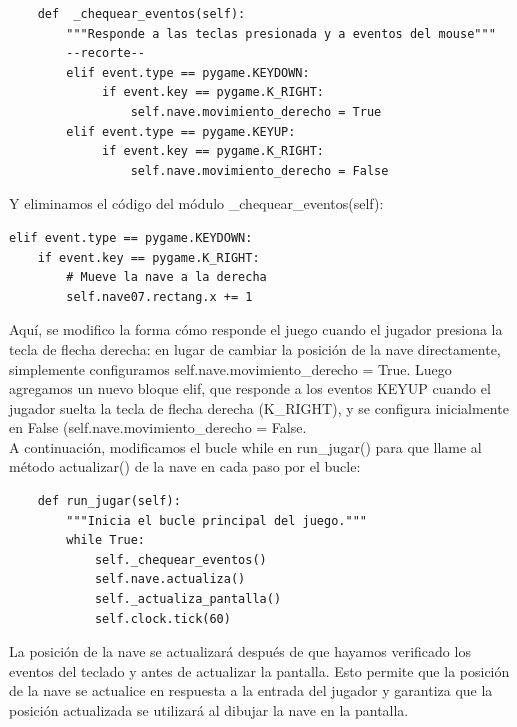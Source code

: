 \begin{lstlisting}
    def  _chequear_eventos(self):
        """Responde a las teclas presionada y a eventos del mouse"""
        --recorte--
        elif event.type == pygame.KEYDOWN:
             if event.key == pygame.K_RIGHT:
                 self.nave.movimiento_derecho = True
        elif event.type == pygame.KEYUP:
             if event.key == pygame.K_RIGHT:
                 self.nave.movimiento_derecho = False
\end{lstlisting}
Y eliminamos el código del módulo  {\ttfamily \_chequear\_eventos(self)}:
\begin{lstlisting}
elif event.type == pygame.KEYDOWN:
    if event.key == pygame.K_RIGHT:
        # Mueve la nave a la derecha
        self.nave07.rectang.x += 1
\end{lstlisting}

Aquí, se modifico la forma cómo responde el juego cuando el jugador presiona la tecla de flecha derecha: en lugar de cambiar
la posición de la nave directamente, simplemente configuramos {\ttfamily self.nave.movimiento\_derecho = True}.  Luego agregamos un nuevo bloque  {\ttfamily elif}, que responde a los eventos {\ttfamily KEYUP} cuando el jugador suelta la tecla de flecha derecha ({\ttfamily K\_RIGHT}), y se configura inicialmente en False ({\ttfamily self.nave.movimiento\_derecho = False}.\\


A continuación, modificamos el bucle while en {\ttfamily run\_jugar()} para que llame al método  {\ttfamily actualizar()} de la nave en cada paso por el bucle:

\hspace{-2.4cm}{\ttfamily \scriptsize invasión}

\vspace{-0.2cm}
\hspace{-2.1cm}{\ttfamily \scriptsize \_alien.py}\vspace{-0.84cm}
\begin{lstlisting}
    def run_jugar(self):
        """Inicia el bucle principal del juego."""
        while True:
            self._chequear_eventos()
            self.nave.actualiza()
            self._actualiza_pantalla()
            self.clock.tick(60)
\end{lstlisting}

La posición de la nave se actualizará después de que hayamos verificado los eventos del teclado y antes de actualizar la pantalla.
Esto permite que la posición de la nave se actualice en respuesta a la entrada del jugador y garantiza que la posición actualizada se utilizará al dibujar la nave en la pantalla.


